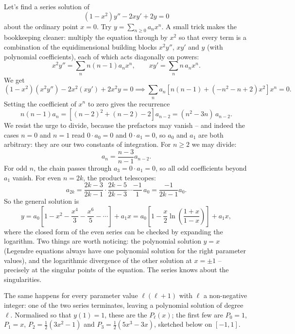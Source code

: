 \begin{example}
	Let's find a series solution of
	$$
	(1 - x^2) y'' - 2xy' + 2y = 0
	$$
	about the ordinary point $x = 0$. Try $y = \sum_{n \geq 0} a_n x^n$. A small trick makes the bookkeeping cleaner: multiply the equation through by $x^2$ so that every term is a combination of the equidimensional building blocks $x^2 y''$, $x y'$ and $y$ (with polynomial coefficients), each of which acts diagonally on powers:
	$$
	x^2 y'' = \sum_n n(n-1) a_n x^n, \qquad xy' = \sum_n n \, a_n x^n.
	$$
	We get
	$$
	(1 - x^2)(x^2 y'') - 2x^2 (xy') + 2x^2 y = 0 \implies \sum_n a_n \left[n(n - 1) + (-n^2 - n + 2)x^2\right] x^n = 0.
	$$
	Setting the coefficient of $x^n$ to zero gives the recurrence
	$$
	n (n - 1) a_n = \left[(n-2)^2 + (n - 2) - 2\right] a_{n - 2} = (n^2 - 3n) \, a_{n - 2}.
	$$
	We resist the urge to divide, because the prefactors may vanish -- and indeed the cases $n = 0$ and $n = 1$ read $0 \cdot a_0 = 0$ and $0 \cdot a_1 = 0$, so $a_0$ and $a_1$ are both arbitrary: they are our two constants of integration. For $n \geq 2$ we may divide:
	$$
	a_n = \frac{n - 3}{n - 1} a_{n - 2}.
	$$
	For odd $n$, the chain passes through $a_3 = 0 \cdot a_1 = 0$, so all odd coefficients beyond $a_1$ vanish. For even $n = 2k$, the product telescopes:
	$$
	a_{2k} = \frac{2k - 3}{2k - 1} \cdot \frac{2k - 5}{2k - 3} \cdots \frac{-1}{1} \, a_0 = \frac{-1}{2k - 1} a_0.
	$$
	So the general solution is
	$$
	y = a_0 \left[1 - x^2 - \frac{x^4}{3} - \frac{x^6}{5} - \cdots \right] + a_1 x = a_0 \left[1 - \frac x2 \ln \left(\frac{1 + x}{1 - x}\right)\right] + a_1 x,
	$$
	where the closed form of the even series can be checked by expanding the logarithm. Two things are worth noticing: the polynomial solution $y = x$ (Legendre equations always have one polynomial solution for the right parameter values), and the logarithmic divergence of the other solution at $x = \pm 1$ -- precisely at the singular points of the equation. The series knows about the singularities.
\end{example}

The same happens for every parameter value $\ell(\ell + 1)$ with $\ell$ a non-negative integer: one of the two series terminates, leaving a polynomial solution of degree $\ell$. Normalised so that $y(1) = 1$, these are the  $P_\ell(x)$; the first few are $P_0 = 1$, $P_1 = x$, $P_2 = \frac12(3x^2 - 1)$ and $P_3 = \frac12 (5x^3 - 3x)$, sketched below on $[-1, 1]$.

